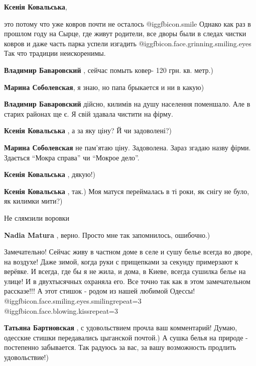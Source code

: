 \begin{itemize}
\begin{itemize} %
\textbf{Ксенія Ковальська}, 

это потому что уже ковров почти не осталось @igg{fbicon.smile}  Однако как раз
в прошлом году на Сырце, где живут родители, все дворы были в следах чистки
ковров и даже часть парка успели изгадить
@igg{fbicon.face.grinning.smiling.eyes}  Так что традиции неискоренимы.

\begin{itemize} %
\textbf{Владимир Баваровский} , сейчас помыть ковер- 120 грн. кв. метр.)

\textbf{Марина Соболевская}, я знаю, но папа брыкается и ни в какую)

\textbf{Владимир Баваровский} дійсно, килимів на душу населення поменшало. Але в старих районах ще є. Я свій здавала чистити на фірму.

\textbf{Ксенія Ковальська} , а за яку ціну? Й чи задоволені?)

\textbf{Марина Соболевская} не пам'ятаю ціну. Задоволена. Зараз згадаю назву фірми. Здається \enquote{Мокра справа} чи \enquote{Мокрое дело}.

\textbf{Ксенія Ковальська} , дякую!)
\end{itemize} %

\textbf{Ксенія Ковальська} , так.) Моя матуся переймалась в ті роки, як снігу не було, як килимки мити?)
\end{itemize} %

Не слямзили воровки

\textbf{Nadia Matura} , верно. Просто мне так запомнилось, ошибочно.)


Замечательно! Сейчас живу в частном доме в селе и сушу белье всегда во дворе, на воздухе! Даже зимой, когда руки с прищепками за секунду примерзают к верёвке. И всегда, где бы я не жила, и дома, в Киеве, всегда сушилка белье на улице! И в двухтысячных охраняла его. Все точно так как в этом замечательном рассказе!!! А этот стишок - родом из нашей любимой Одессы!  @igg{fbicon.face.smiling.eyes.smiling}{repeat=3}  @igg{fbicon.face.blowing.kiss}{repeat=3} 

\begin{itemize} %
\textbf{Татьяна Бартновская} , с удовольствием прочла ваш комментарий! Думаю, одесские стишки передавались цыганской почтой.) А сушка белья на природе - постепенно забывается. Так радуюсь за вас, за вашу возможность продлить удовольствие!)


\end{itemize}
\end{itemize}
